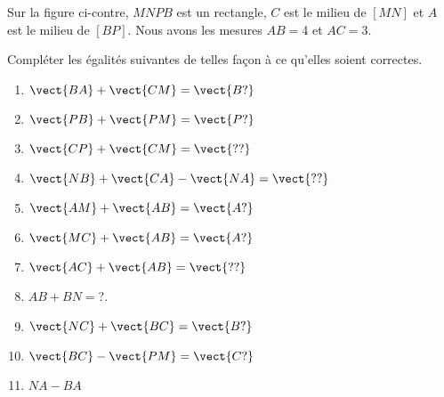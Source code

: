 
\begin{exercice}\label{exosmath-0221}

    \begin{multicols}{2}
        Sur la figure ci-contre, \( MNPB\) est un rectangle, \( C\) est le milieu de \( [MN]\) et $A$ est le milieu de \( [BP]\). Nous avons les mesures \( AB=\)\unit{4}{\centi\meter} et \( AC=\)\unit{3}{\centi\meter}.

    \columnbreak


    \begin{center}

    \end{center}

    \end{multicols}
    Compléter les égalités suivantes de telles façon à ce qu'elles soient correctes.
    \begin{multicols}{3}
        \begin{enumerate}
            \item
                \( \vect{ BA }+\vect{ CM }=\vect{ B? }\) 
            \item
                \( \vect{ PB }+\vect{ PM }=\vect{ P? }\)
            \item
                \( \vect{ CP }+\vect{ CM }=\vect{ ?? }\)
            \item
                \( \vect{ NB }+\vect{ CA }-\vect{ NA }=\vect{ ?? }\)
            \item
                \( \vect{ AM }+\vect{ AB }=\vect{ A? }\)
            \item
                \( \vect{ MC }+\vect{ AB }=\vect{ A? }\)
            \item
                \( \vect{ AC }+\vect{ AB }=\vect{ ?? }\)
            \item
                \( AB+BN=\)\unit{?}{\centi\meter}.
            \item
                \( \vect{ NC }+\vect{ BC }=\vect{ B? }\)
            \item
                \( \vect{ BC }-\vect{ PM }=\vect{ C? }\)
            \item
                \( NA-BA\)
        \end{enumerate}
    \end{multicols}

\end{exercice}
